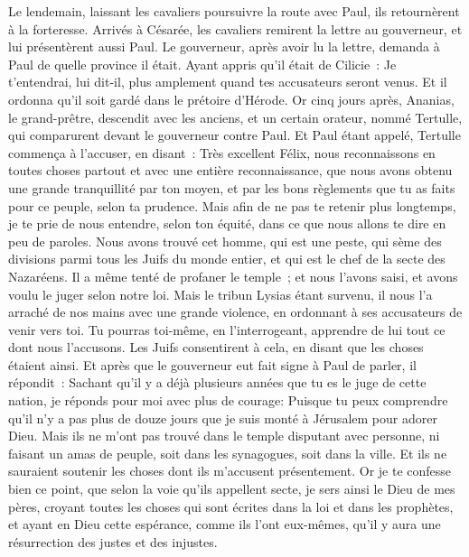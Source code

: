 \begin{multicols}{2}
Le lendemain, laissant les cavaliers poursuivre la route avec Paul, ils retournèrent à la forteresse.
Arrivés à Césarée, les cavaliers remirent la lettre au gouverneur, et lui présentèrent aussi Paul.
Le gouverneur, après avoir lu la lettre, demanda à Paul de quelle province il était. Ayant appris qu'il était de Cilicie~:
Je t'entendrai, lui dit-il, plus amplement quand tes accusateurs seront venus. Et il ordonna qu'il soit gardé dans le prétoire d'Hérode.
\VerseOne{}Or cinq jours après, Ananias, le grand-prêtre, descendit avec les anciens, et un certain orateur, nommé Tertulle, qui comparurent devant le gouverneur contre Paul. 
Et Paul étant appelé, Tertulle commença à l'accuser, en disant~:
Très excellent Félix, nous reconnaissons en toutes choses partout et avec une entière reconnaissance, que nous avons obtenu une grande tranquillité par ton moyen, et par les bons règlements que tu as faits pour ce peuple, selon ta prudence.
Mais afin de ne pas te retenir plus longtemps, je te prie de nous entendre, selon ton équité, dans ce que nous allons te dire en peu de paroles.
Nous avons trouvé cet homme, qui est une peste, qui sème des divisions parmi tous les Juifs du monde entier, et qui est le chef de la secte des Nazaréens.
Il a même tenté de profaner le temple~; et nous l'avons saisi, et avons voulu le juger selon notre loi.
Mais le tribun Lysias étant survenu, il nous l'a arraché de nos mains avec une grande violence,
en ordonnant à ses accusateurs de venir vers toi. Tu pourras toi-même, en l'interrogeant, apprendre de lui tout ce dont nous l'accusons.
Les Juifs consentirent à cela, en disant que les choses étaient ainsi.
Et après que le gouverneur eut fait signe à Paul de parler, il répondit~: Sachant qu'il y a déjà plusieurs années que tu es le juge de cette nation, je réponds pour moi avec plus de courage:
Puisque tu peux comprendre qu'il n'y a pas plus de douze jours que je suis monté à Jérusalem pour adorer Dieu.
Mais ils ne m'ont pas trouvé dans le temple disputant avec personne, ni faisant un amas de peuple, soit dans les synagogues, soit dans la ville. 
Et ils ne sauraient soutenir les choses dont ils m'accusent présentement.
Or je te confesse bien ce point, que selon la voie qu'ils appellent secte, je sers ainsi le Dieu de mes pères, croyant toutes les choses qui sont écrites dans la loi et dans les prophètes,
et ayant en Dieu cette espérance, comme ils l'ont eux-mêmes, qu'il y aura une résurrection des justes et des injustes.

\end{multicols}
